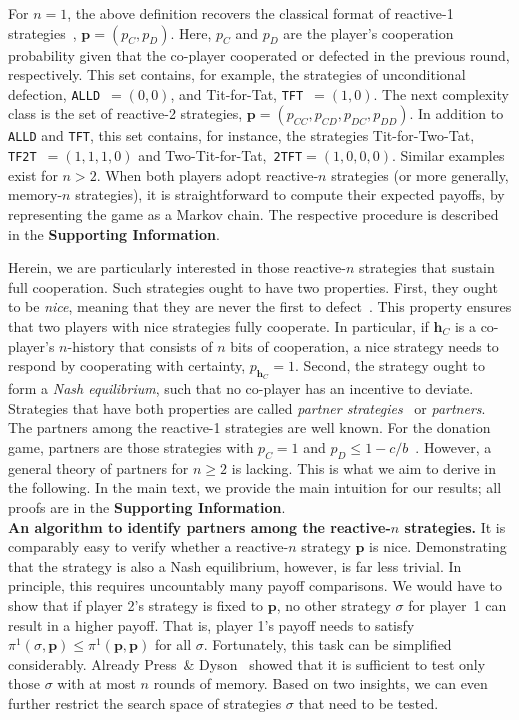 \documentclass[9pt,twocolumn,twoside]{pnas-new}
\def\tft{\texttt{TFT}}
\def\tftt{\texttt{TF2T}}
\def\ttft{\texttt{2TFT}}
\def\alld{\texttt{ALLD}}
\def\SI{\textbf{Supporting Information}}
\begin{document}
For \(n\!=\!1\), the above definition recovers the classical format of reactive-1 strategies~\cite{sigmund2010}, \(\mathbf{p}\!=\!(p_C, p_D)\). 
Here, $p_C$ and $p_D$ are the player's cooperation probability given that the co-player cooperated or defected in the previous round, respectively. 
This set contains, for example, the strategies of unconditional defection, \alld~$=\!(0,0)$, and Tit-for-Tat, \tft~$=\!(1,0)$. 
The next complexity class is the set of reactive-2 strategies, $\mathbf{p}\!=\!(p_{CC},p_{CD},p_{DC},p_{DD})$.
In addition to \alld{} and \tft{}, this set contains, for instance, the strategies Tit-for-Two-Tat, \tftt~$=\!(1,1,1,0)$ and Two-Tit-for-Tat,~\ttft$=\!(1,0,0,0)$. 
Similar examples exist for $n\!>\!2$. 
When both players adopt reactive-$n$ strategies (or more generally, memory-$n$ strategies), it is straightforward to compute their expected payoffs, by representing the game as a Markov chain. 
The respective procedure is described in the \SI{}.  

Herein, we are particularly interested in those reactive-$n$ strategies that sustain full cooperation. 
Such strategies ought to have two properties. 
First, they ought to be {\it nice}, meaning that they are never the first to defect~\citep{axelrod:AAAS:1981}.
This property ensures that two players with nice strategies fully cooperate. 
In particular, if $\mathbf{h}_C$ is a co-player's $n$-history that consists of $n$ bits of cooperation, a nice strategy needs to respond by cooperating with certainty, $p_{\mathbf{h}_C}\!=\!1$.  
Second, the strategy ought to form a {\it Nash equilibrium}, such that no co-player has an incentive to deviate. 
Strategies that have both properties are called {\it partner strategies}~\citep{Hilbe:GEB:2015} or {\it partners}.
The partners among the reactive-1 strategies are well known. 
For the donation game, partners are those strategies with $p_C\!=\!1$ and $p_D\!\le\!1\!-\!c/b$~\citep{akin:EGADS:2016}. 
However, a general theory of partners for $n\!\ge\!2$ is lacking. 
This is what we aim to derive in the following. 
In the main text, we provide the main intuition for our results; all proofs are in the \SI.\\

\noindent
\textbf{An algorithm to identify partners among the reactive-$n$ strategies.} 
It is comparably easy to verify whether a reactive-$n$ strategy $\mathbf{p}$ is nice. 
Demonstrating that the strategy is also a Nash equilibrium, however, is far less trivial. 
In principle, this requires uncountably many payoff comparisons. 
We would have to show that if player 2's strategy is fixed to $\mathbf{p}$, no other strategy $\sigma$ for player~1 can result in a higher payoff. That is, player 1's payoff needs to satisfy $\pi^1(\sigma,\mathbf{p})\!\le\!\pi^1(\mathbf{p},\mathbf{p})$ for all $\sigma$. 
Fortunately, this task can be simplified considerably. 
Already Press~\& Dyson~\cite{press:PNAS:2012} showed that it is sufficient to test only those $\sigma$ with at most $n$ rounds of memory. 
Based on two insights, we can even further restrict the search space of strategies $\sigma$ that need to be tested.
\end{document}
